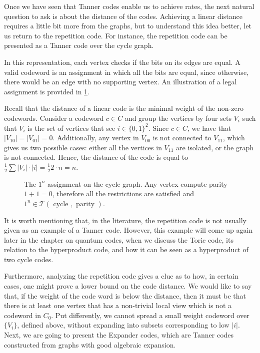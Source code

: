 \documentclass[12pt,a4paper]{article}
\begin{document}
  Once we have seen that Tanner codes enable us to achieve rates, the next natural question to ask is about the distance of the codes. Achieving a linear distance requires a little bit more from the graphs, but to understand this idea better, let us return to the repetition code. For instance, the repetition code can be presented as a Tanner code over the cycle graph.  

  \begin{example}
    In this representation, each vertex checks if the bits on its edges are equal. A valid codeword is an assignment in which all the bits are equal, since otherwise, there would be an edge with no supporting vertex. An illustration of a legal assignment is provided in \cref{fig:cyc}.
    

Recall that the distance of a linear code is the minimal weight of the non-zero codewords. Consider a codeword $c \in C$ and group the vertices by four sets $V_i$ such that $V_i$ is the set of vertices that see $i \in \{0,1\}^{2}$. Since $c \in C$, we have that $|V_{10}|=|V_{01}| = 0$. Additionally, any vertex in $V_{00}$ is not connected to $V_{11}$, which gives us two possible cases: either all the vertices in $V_{11}$ are isolated, or the graph is not connected. Hence, the distance of the code is equal to $\frac{1}{2}\sum{|V_{i}|\cdot |i|} = \frac{1}{2}2 \cdot n = n$.
  \end{example} 


 \begin{figure}[h]
   \begin{center}
  \label{fig:cyc}
 
\caption{The $1^{n}$ assignment on the cycle graph. Any vertex compute parity $1 + 1 = 0$, therefore all the restrictions are satisfied and $1^n \in \mathcal{T} \left( \text{ cycle } , \text{ parity }  \right) $.}
\end{center}
\end{figure}

It is worth mentioning that, in the literature, the repetition code is not usually given as an example of a Tanner code. However, this example will come up again later in the chapter on quantum codes, when we discuss the Toric code, its relation to the hyperproduct code, and how it can be seen as a hyperproduct of two cycle codes.

Furthermore, analyzing the repetition code gives a clue as to how, in certain cases, one might prove a lower bound on the code distance. We would like to say that, if the weight of the code word is below the distance, then it must be that there is at least one vertex that has a non-trivial local view which is not a codeword in $C_{0}$. Put differently, we cannot spread a small weight codeword over $\{V_{i}\}$, defined above, without expanding into subsets corresponding to low $|i|$. Next, we are going to present the Expander codes, which are Tanner codes constructed from graphs with good algebraic expansion.
\end{document}
